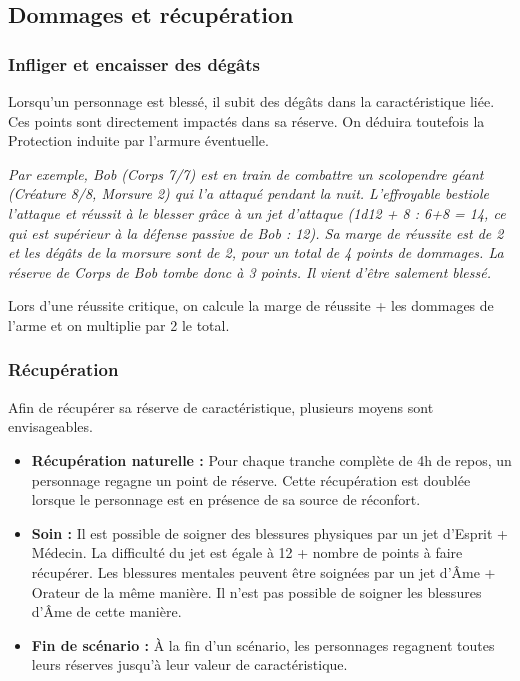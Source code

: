 \documentclass[10pt,twoside,twocolumn,openany,bg=print,justified]{dndbook}
\begin{document}
\subsection{Dommages et récupération}

\subsubsection*{Infliger et encaisser des dégâts}

Lorsqu'un personnage est blessé, il subit des dégâts dans la caractéristique liée. Ces points sont directement impactés dans sa réserve. On déduira toutefois la Protection induite par l'armure éventuelle.

\emph{Par exemple, Bob (Corps 7/7) est en train de combattre un scolopendre géant (Créature 8/8, Morsure 2) qui l'a attaqué pendant la nuit. L'effroyable bestiole l'attaque et réussit à le blesser grâce à un jet d'attaque (1d12 + 8 : 6+8 = 14, ce qui est supérieur à la défense passive de Bob : 12). Sa marge de réussite est de 2 et les dégâts de la morsure sont de 2, pour un total de 4 points de dommages. La réserve de Corps de Bob tombe donc à 3 points. Il vient d'être salement blessé.}

Lors d'une réussite critique, on calcule la marge de réussite + les dommages de l'arme et on multiplie par 2 le total.

\subsubsection*{Récupération}

Afin de récupérer sa réserve de caractéristique, plusieurs moyens sont envisageables.

\begin{itemize}
\item \textbf{Récupération naturelle :} Pour chaque tranche complète de 4h de repos, un personnage regagne un point de réserve. Cette récupération est doublée lorsque le personnage est en présence de sa source de réconfort.
\item \textbf{Soin :} Il est possible de soigner des blessures physiques par un jet d'Esprit + Médecin. La difficulté du jet est égale à 12 + nombre de points à faire récupérer. Les blessures mentales peuvent être soignées par un jet d'Âme + Orateur de la même manière. Il n'est pas possible de soigner les blessures d'Âme de cette manière.
\item \textbf{Fin de scénario :} À la fin d'un scénario, les personnages regagnent toutes leurs réserves jusqu'à leur valeur de caractéristique.
\end{itemize}
\end{document}
